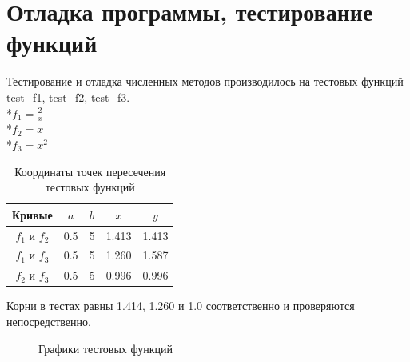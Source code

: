 \documentclass[a4paper,12pt,titlepage,finall]{article}
\begin{document}
\newpage

\section{Отладка программы, тестирование функций}

Тестирование и отладка численных методов производилось на тестовых функций test\_f1, test\_f2, test\_f3.
\\*$f_1 = \frac{2}{x}$
\\*$f_2 = x$
\\*$f_3 = x^2$

\begin{table}[h]
\centering
\begin{tabular}{|c|c|c|c|c|}
\hline
Кривые & $a$ & $b$ & $x$ & $y$ \\
\hline
$f_1$ и $f_2$ & 0.5 & 5 & 1.413 & 1.413 \\
$f_1$ и $f_3$ & 0.5 & 5 & 1.260 & 1.587 \\
$f_2$ и $f_3$ & 0.5 & 5 & 0.996 & 0.996 \\
\hline
\end{tabular}
\caption{Координаты точек пересечения тестовых функций}
\label{table2}
\end{table}

Корни в тестах равны 1.414, 1.260 и 1.0 соответственно и проверяются непосредственно.

\begin{figure}[h]
\centering
{}
\caption{Графики тестовых функций}
\label{plot3}
\end{figure}
\end{document}
